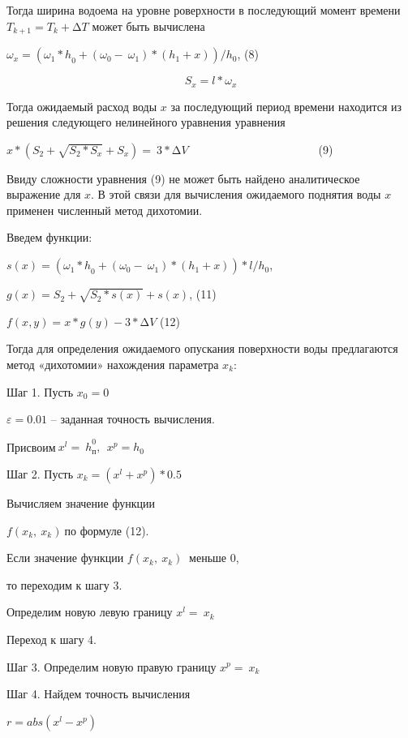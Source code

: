 {Тогда ширина водоема на уровне роверхности в последующий момент времени
\(T_{k + 1} = T_{k} + \mathrm{\Delta}T\) может быть вычислена

\(\omega_{x} = ({\omega_{1}*h}_{0} + \left( \omega_{0} - \ \omega_{1} \right)*(h_{1} + x))/h_{0}\),
(8)

\[S_{x} = l*\omega_{x}\]

Тогда ожидаемый расход воды \(x\) за последующий период времени
находится из решения следующего нелинейного уравнения уравнения

\(x*\left( S_{2} + \sqrt{S_{2}*S_{x}} + S_{x} \right) = \ 3*\mathrm{\Delta}V\ \ \ \ \ \ \ \ \ \ \ \ \ \ \ \ \ \ \ \ \ \ \ \ \ \ \ \ \ \ \ \ \ \ \ \ \ \ \ \ \ \ \ \ \ \ \ \ \ \ \ \ \)(9)

Ввиду сложности уравнения (9) не может быть найдено аналитическое
выражение для \(x\). В этой связи для вычисления ожидаемого поднятия
воды \(x\ \)применен численный метод дихотомии.

Введем функции\(:\)

\(s(x) = \left( {\omega_{1}*h}_{0} + \left( \omega_{0} - \ \omega_{1} \right)*\left( h_{1} + x \right) \right)*l/h_{0}\),

\(g(x) = S_{2} + \sqrt{S_{2}*s(x)} + s(x)\), (11)

\(f(x,y) = x*g(y) - 3*\mathrm{\Delta}V\) (12)

Тогда для определения ожидаемого опускания поверхности воды предлагаются
метод «дихотомии» нахождения параметра \(x_{k}:\)

Шаг 1. Пусть \(x_{0} = 0\)

\(\varepsilon = 0.01\) -- заданная точность вычисления.

Присвоим\(\ {x^{l} = \ h}_{п}^{0},\ {\ x}^{p} = h_{0}\)

Шаг 2. Пусть \(x_{k} = \left( x^{l} + x^{p} \right)*0.5\)

Вычисляем значение функции

\(f\left( x_{k},\ x_{k} \right)\ \)по формуле (12).

Если значение функции \(f\left( x_{k},\ x_{k} \right)\ \) меньше 0,

то переходим к шагу 3.

Определим новую левую границу \(x^{l} = \ x_{k}\)

Переход к шагу 4.

Шаг 3. Определим новую правую границу \(x^{p} = \ x_{k}\)

Шаг 4. Найдем точность вычисления

\(r = abs\left( x^{l} - x^{p} \right)\)

}
